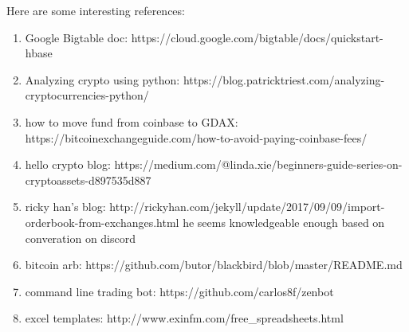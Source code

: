 Here are some interesting references:

\begin{enumerate}
	\item Google Bigtable doc: https://cloud.google.com/bigtable/docs/quickstart-hbase
	\item Analyzing crypto using python: https://blog.patricktriest.com/analyzing-cryptocurrencies-python/
	\item how to move fund from coinbase to GDAX: https://bitcoinexchangeguide.com/how-to-avoid-paying-coinbase-fees/
	\item hello crypto blog: https://medium.com/@linda.xie/beginners-guide-series-on-cryptoassets-d897535d887
	\item ricky han's blog: http://rickyhan.com/jekyll/update/2017/09/09/import-orderbook-from-exchanges.html
		  he seems knowledgeable enough based on converation on discord
	\item bitcoin arb: https://github.com/butor/blackbird/blob/master/README.md
	\item command line trading bot: https://github.com/carlos8f/zenbot
	\item excel templates: http://www.exinfm.com/free_spreadsheets.html
\end{enumerate}
